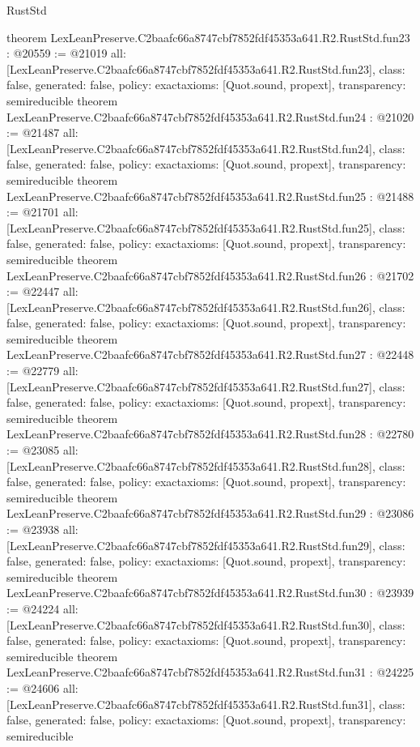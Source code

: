 \begin{lexlean}{RustStd}
\begin{coremodule}
{}
theorem LexLeanPreserve.C2baafc66a8747cbf7852fdf45353a641.R2.RustStd.fun23 : @20559 := @21019 {
  all: [LexLeanPreserve.C2baafc66a8747cbf7852fdf45353a641.R2.RustStd.fun23],
  class: false,
  generated: false,
  policy: exact{axioms: [Quot.sound, propext]},
  transparency: semireducible
}
theorem LexLeanPreserve.C2baafc66a8747cbf7852fdf45353a641.R2.RustStd.fun24 : @21020 := @21487 {
  all: [LexLeanPreserve.C2baafc66a8747cbf7852fdf45353a641.R2.RustStd.fun24],
  class: false,
  generated: false,
  policy: exact{axioms: [Quot.sound, propext]},
  transparency: semireducible
}
theorem LexLeanPreserve.C2baafc66a8747cbf7852fdf45353a641.R2.RustStd.fun25 : @21488 := @21701 {
  all: [LexLeanPreserve.C2baafc66a8747cbf7852fdf45353a641.R2.RustStd.fun25],
  class: false,
  generated: false,
  policy: exact{axioms: [Quot.sound, propext]},
  transparency: semireducible
}
theorem LexLeanPreserve.C2baafc66a8747cbf7852fdf45353a641.R2.RustStd.fun26 : @21702 := @22447 {
  all: [LexLeanPreserve.C2baafc66a8747cbf7852fdf45353a641.R2.RustStd.fun26],
  class: false,
  generated: false,
  policy: exact{axioms: [Quot.sound, propext]},
  transparency: semireducible
}
theorem LexLeanPreserve.C2baafc66a8747cbf7852fdf45353a641.R2.RustStd.fun27 : @22448 := @22779 {
  all: [LexLeanPreserve.C2baafc66a8747cbf7852fdf45353a641.R2.RustStd.fun27],
  class: false,
  generated: false,
  policy: exact{axioms: [Quot.sound, propext]},
  transparency: semireducible
}
theorem LexLeanPreserve.C2baafc66a8747cbf7852fdf45353a641.R2.RustStd.fun28 : @22780 := @23085 {
  all: [LexLeanPreserve.C2baafc66a8747cbf7852fdf45353a641.R2.RustStd.fun28],
  class: false,
  generated: false,
  policy: exact{axioms: [Quot.sound, propext]},
  transparency: semireducible
}
theorem LexLeanPreserve.C2baafc66a8747cbf7852fdf45353a641.R2.RustStd.fun29 : @23086 := @23938 {
  all: [LexLeanPreserve.C2baafc66a8747cbf7852fdf45353a641.R2.RustStd.fun29],
  class: false,
  generated: false,
  policy: exact{axioms: [Quot.sound, propext]},
  transparency: semireducible
}
theorem LexLeanPreserve.C2baafc66a8747cbf7852fdf45353a641.R2.RustStd.fun30 : @23939 := @24224 {
  all: [LexLeanPreserve.C2baafc66a8747cbf7852fdf45353a641.R2.RustStd.fun30],
  class: false,
  generated: false,
  policy: exact{axioms: [Quot.sound, propext]},
  transparency: semireducible
}
theorem LexLeanPreserve.C2baafc66a8747cbf7852fdf45353a641.R2.RustStd.fun31 : @24225 := @24606 {
  all: [LexLeanPreserve.C2baafc66a8747cbf7852fdf45353a641.R2.RustStd.fun31],
  class: false,
  generated: false,
  policy: exact{axioms: [Quot.sound, propext]},
  transparency: semireducible
}
\end{coremodule}
\end{lexlean}
